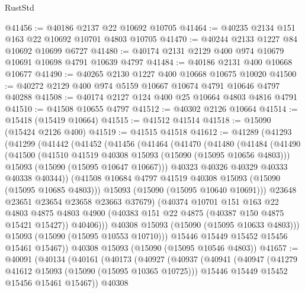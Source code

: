 \begin{lexlean}{RustStd}
\begin{coremodule}
@41456 := @40186 @2137 @22 @10692 @10705
@41464 := @40235 @2134 @151 @163 @22 @10692 @10701 @4803 @10705
@41470 := @40244 @2133 @1227 @84 @10692 @10699 @6727
@41480 := @40174 @2131 @2129 @400 @974 @10679 @10691 @10698 @4791 @10639 @4797
@41484 := @40186 @2131 @400 @10668 @10677
@41490 := @40265 @2130 @1227 @400 @10668 @10675 @10020
@41500 := @40272 @2129 @400 @974 @5159 @10667 @10674 @4791 @10646 @4797 @40288
@41508 := @40174 @2127 @124 @400 @25 @10664 @4803 @4816 @4791
@41510 := @41508 @10655 @4797
@41512 := @40302 @2126 @10664
@41514 := @15418 (@15419 @10664)
@41515 := @41512 @41514
@41518 := @15090 (@15424 @2126 @400)
@41519 := @41515 @41518
@41612 := @41289
    (@41293
      (@41299
        (@41442
          (@41452
            (@41456
              (@41464
                (@41470
                  (@41480
                    (@41484
                      (@41490
                        (@41500
                          (@41510 @41519 @40308 @15093 (@15090 (@15095 @10656 @4803)))
                          @15093
                          (@15090 (@15095 @10647 @10667)))
                        @40323
                        @40326
                        @40329
                        @40333
                        @40338
                        @40344))
                    (@41508 @10684 @4797 @41519 @40308 @15093 (@15090 (@15095 @10685 @4803)))
                    @15093
                    (@15090 (@15095 @10640 @10691)))
                  @23648
                  @23651
                  @23654
                  @23658
                  @23663
                  @37679)
                (@40374
                  @10701
                  @151
                  @163
                  @22
                  @4803
                  @4875
                  @4803
                  @4900
                  (@40383 @151 @22 @4875 (@40387 @150 @4875 @15421 @15427))
                  @40406)))
            @40308
            @15093
            (@15090 (@15095 @10633 @4803)))
          @15093
          (@15090 (@15095 @10553 @10710)))
        @15446
        @15449
        @15452
        @15456
        @15461
        @15467))
    @40308
    @15093
    (@15090 (@15095 @10546 @4803))
@41657 := @40091
    (@40134
      (@40161
        (@40173
          (@40927
            (@40937
              (@40941
                (@40947
                  (@41279 @41612 @15093 (@15090 (@15095 @10365 @10725)))
                  @15446
                  @15449
                  @15452
                  @15456
                  @15461
                  @15467))
              @40308

\end{coremodule}
\end{lexlean}
